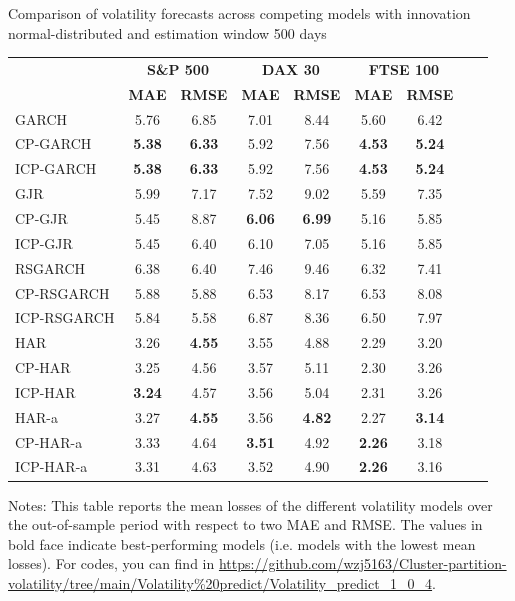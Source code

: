 \documentclass[preprint,12pt,authoryear]{elsarticle}
\begin{document}
\begin{center}
\begin{threeparttable}
\centering \footnotesize
\caption{\footnotesize Comparison of volatility forecasts across competing models with innovation normal-distributed and estimation window 500 days}\label{tab34_3_2}
\begin{tabular}{l c c c c c c c c}
\toprule
 & \multicolumn{2}{c}{\textbf{S\&P 500}} & \multicolumn{2}{c}{\textbf{DAX 30}} & \multicolumn{2}{c}{\textbf{FTSE 100}} \\
\cmidrule(r){2-3} \cmidrule(r){4-5} \cmidrule(r){6-7}
 & \textbf{MAE} & \textbf{RMSE} & \textbf{MAE} & \textbf{RMSE} & \textbf{MAE} & \textbf{RMSE} \\
\cmidrule{2-7}
GARCH        &  5.76  &   6.85  &   7.01  &  8.44  &   5.60  &   6.42  \\
CP-GARCH     & \textbf{5.38} & \textbf{6.33} & 5.92 & 7.56 & \textbf{4.53} & \textbf{5.24} \\
ICP-GARCH    & \textbf{5.38} & \textbf{6.33} & 5.92 & 7.56 & \textbf{4.53} & \textbf{5.24} \\
GJR          &  5.99  &   7.17  &   7.52  &  9.02  &   5.59  &   7.35  \\
CP-GJR       &  5.45  &   8.87  & \textbf{6.06} & \textbf{6.99} & 5.16 & 5.85 \\
ICP-GJR      &  5.45  &   6.40  &   6.10  &  7.05  & 5.16 & 5.85 \\
RSGARCH      &  6.38  &   6.40  &   7.46  &  9.46  &   6.32  &   7.41  \\
CP-RSGARCH   &  5.88  &   5.88  &   6.53  &  8.17  &   6.53  &   8.08  \\
ICP-RSGARCH  &  5.84  &   5.58  &   6.87  &  8.36  &   6.50  &   7.97  \\
\midrule
HAR          &  3.26  & \textbf{4.55} & 3.55 & 4.88 & 2.29 & 3.20 \\
CP-HAR       &  3.25  &   4.56  &   3.57  &  5.11  &   2.30  &   3.26 \\
ICP-HAR      & \textbf{3.24} & 4.57 & 3.56 & 5.04 & 2.31 & 3.26 \\
HAR-a        &  3.27  & \textbf{4.55} & 3.56 & \textbf{4.82} & 2.27 & \textbf{3.14} \\
CP-HAR-a     &  3.33  &   4.64  & \textbf{3.51} & 4.92 & \textbf{2.26} & 3.18 \\
ICP-HAR-a    &  3.31  &   4.63  &   3.52  &  4.90  & \textbf{2.26} & 3.16 \\
\bottomrule
\end{tabular}
Notes: This table reports the mean losses of the different volatility models over the out-of-sample period with respect to two MAE and RMSE. The values in bold face indicate best-performing models (i.e. models with the lowest mean losses). For codes, you can find in
\url{https://github.com/wzj5163/Cluster-partition-volatility/tree/main/Volatility\%20predict/Volatility_predict_1_0_4}.
\end{threeparttable}
\end{center}
\end{document}

